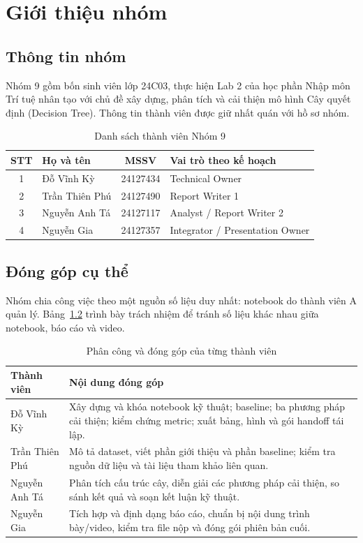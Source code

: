 \chapter{Giới thiệu nhóm}
\label{chap:group}

\section{Thông tin nhóm}

Nhóm 9 gồm bốn sinh viên lớp 24C03, thực hiện Lab 2 của học phần Nhập môn
Trí tuệ nhân tạo với chủ đề xây dựng, phân tích và cải thiện mô hình Cây quyết
định (Decision Tree). Thông tin thành viên được giữ nhất quán với hồ sơ nhóm.

\begin{table}[H]
\centering
\caption{Danh sách thành viên Nhóm 9}
\label{tab:members}
\begin{tabular}{clcl}
\toprule
STT & Họ và tên & MSSV & Vai trò theo kế hoạch \\
\midrule
1 & Đỗ Vĩnh Kỳ & 24127434 & Technical Owner \\
2 & Trần Thiên Phú & 24127490 & Report Writer 1 \\
3 & Nguyễn Anh Tá & 24127117 & Analyst / Report Writer 2 \\
4 & Nguyễn Gia & 24127357 & Integrator / Presentation Owner \\
\bottomrule
\end{tabular}
\end{table}

\section{Đóng góp cụ thể}

Nhóm chia công việc theo một nguồn số liệu duy nhất: notebook do thành viên A
quản lý. Bảng~\ref{tab:contributions} trình bày trách nhiệm để tránh số liệu
khác nhau giữa notebook, báo cáo và video.

\begin{table}[H]
\centering
\caption{Phân công và đóng góp của từng thành viên}
\label{tab:contributions}
\begin{tabular}{p{3.2cm}p{10.8cm}}
\toprule
Thành viên & Nội dung đóng góp \\
\midrule
Đỗ Vĩnh Kỳ & Xây dựng và khóa notebook kỹ thuật; baseline; ba phương pháp cải
thiện; kiểm chứng metric; xuất bảng, hình và gói handoff tái lập. \\
Trần Thiên Phú & Mô tả dataset, viết phần giới thiệu và phần baseline; kiểm tra
nguồn dữ liệu và tài liệu tham khảo liên quan. \\
Nguyễn Anh Tá & Phân tích cấu trúc cây, diễn giải các phương pháp cải thiện,
so sánh kết quả và soạn kết luận kỹ thuật. \\
Nguyễn Gia & Tích hợp và định dạng báo cáo, chuẩn bị nội dung trình bày/video,
kiểm tra file nộp và đóng gói phiên bản cuối. \\
\bottomrule
\end{tabular}
\end{table}

